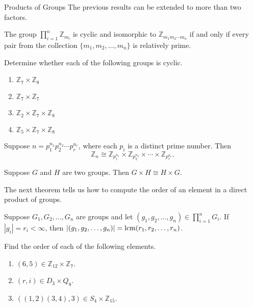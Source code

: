 \begin{section}{Products of Groups}
The previous results can be extended to more than two factors.

\begin{theorem}
The group $\prod_{i=1}^n \mathbb{Z}_{m_i}$ is cyclic and isomorphic to $\mathbb{Z}_{m_1m_2\cdots m_n}$ if and only if every pair from the collection $\{m_1,m_2,\ldots, m_n\}$ is relatively prime.
\end{theorem}

\begin{exercise}
Determine whether each of the following groups is cyclic.
\begin{enumerate}[label=\rm{(\alph*)}]
\item $\mathbb{Z}_7\times \mathbb{Z}_8$
\item $\mathbb{Z}_7\times \mathbb{Z}_7$
\item $\mathbb{Z}_2\times \mathbb{Z}_7\times \mathbb{Z}_8$
\item $\mathbb{Z}_5\times \mathbb{Z}_7\times \mathbb{Z}_8$
\end{enumerate}
\end{exercise}

\begin{theorem}
Suppose $n=p_1^{n_1}p_2^{n_2}\cdots p_r^{n_r}$, where each $p_i$ is a distinct prime number.  Then
\[
\mathbb{Z}_n\cong \mathbb{Z}_{p_1^{n_1}}\times \mathbb{Z}_{p_2^{n_2}}\times \cdots \times \mathbb{Z}_{p_r^{n_r}}.
\]
\end{theorem}

\begin{theorem}
Suppose $G$ and $H$ are two groups.  Then $G\times H\cong H\times G$.
\end{theorem}

The next theorem tells us how to compute the order of an element in a direct product of groups.

\begin{theorem}
Suppose $G_1, G_2,\ldots, G_n$ are groups and let $(g_1,g_2,\ldots, g_n)\in \prod_{i=1}^nG_i$.  If $|g_i|=r_i<\infty$, then $|(g_1,g_2,\ldots, g_n)|=\operatorname{lcm}(r_1,r_2,\ldots,r_n)$.
\end{theorem}

\begin{exercise}
Find the order of each of the following elements.
\begin{enumerate}[label=\rm{(\alph*)}]
\item $(6,5)\in\mathbb{Z}_{12}\times \mathbb{Z}_7$.
\item $(r,i)\in D_3\times Q_8$.
\item $((1,2)(3,4),3)\in S_4\times \mathbb{Z}_{15}$.
\end{enumerate}
\end{exercise}


\end{section}
